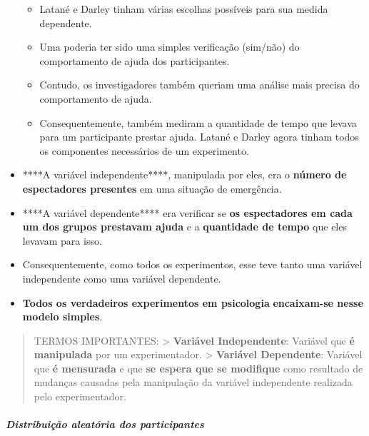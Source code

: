 \documentclass[
]{book}
\providecommand{\tightlist}{%
  \setlength{\itemsep}{0pt}\setlength{\parskip}{0pt}}
\begin{document}
\begin{itemize}
  \begin{itemize}
  \tightlist
  \item
    Latané e Darley tinham várias escolhas possíveis para sua medida dependente.
  \item
    Uma poderia ter sido uma simples verificação (sim/não) do comportamento de ajuda dos participantes.
  \item
    Contudo, os investigadores também queriam uma análise mais precisa do comportamento de ajuda.
  \item
    Consequentemente, também mediram a quantidade de tempo que levava para um participante prestar ajuda. Latané e Darley agora tinham todos os componentes necessários de um experimento.
  \end{itemize}
\item
  ****A variável independente****, manipulada por eles, era o \textbf{número de espectadores presentes} em uma situação de emergência.
\item
  ****A variável dependente**** era verificar se \textbf{os espectadores em cada um dos grupos prestavam ajuda} e a \textbf{quantidade de tempo} que eles levavam para isso.
\item
  Consequentemente, como todos os experimentos, esse teve tanto uma variável independente
  como uma variável dependente.
\item
  \textbf{Todos os verdadeiros experimentos em psicologia} \textbf{encaixam-se nesse modelo simples}.
\end{itemize}

\begin{quote}
TERMOS IMPORTANTES:
\textgreater{} \textbf{Variável Independente}: Variável que \textbf{é manipulada} por um experimentador.
\textgreater{} \textbf{Variável Dependente}: Variável que \textbf{é mensurada }e que \textbf{se espera que se modifique} como resultado de mudanças causadas pela manipulação da variável independente realizada pelo experimentador.
\end{quote}

\hypertarget{distribuiuxe7uxe3o-aleatuxf3ria-dos-participantes}{%
\subparagraph{Distribuição aleatória dos participantes}\label{distribuiuxe7uxe3o-aleatuxf3ria-dos-participantes}}
\end{document}
